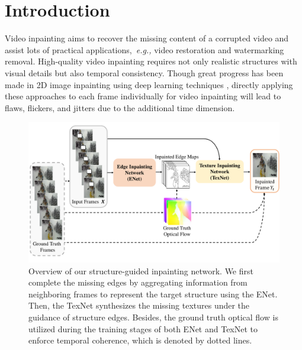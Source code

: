 

\section{Introduction}


Video inpainting aims to recover the missing content of a corrupted video and assist lots of practical applications,~\emph{e.g.,} video restoration and watermarking removal. 
High-quality video inpainting requires not only realistic structures with visual details but also temporal consistency. 
% 
Though great progress has been made in 2D image inpainting using deep learning techniques \cite{yu2018free,Xiong_2019_CVPR,wang2018high}, directly applying these approaches to each frame individually for video inpainting will lead to flaws, flickers, and jitters due to the additional time dimension. 

\begin{figure}[t]
	\centering
	\includegraphics[width=1.01\columnwidth]{zong} %
	\caption{Overview of our structure-guided inpainting network. We first complete the missing edges by aggregating information from neighboring frames to represent the target structure using the ENet. Then, the TexNet synthesizes the missing textures under the guidance of structure edges. Besides, the ground truth optical flow is utilized during the training stages of both ENet and TexNet to enforce temporal coherence, which is denoted by dotted lines.}
	\label{zong}
\end{figure}







